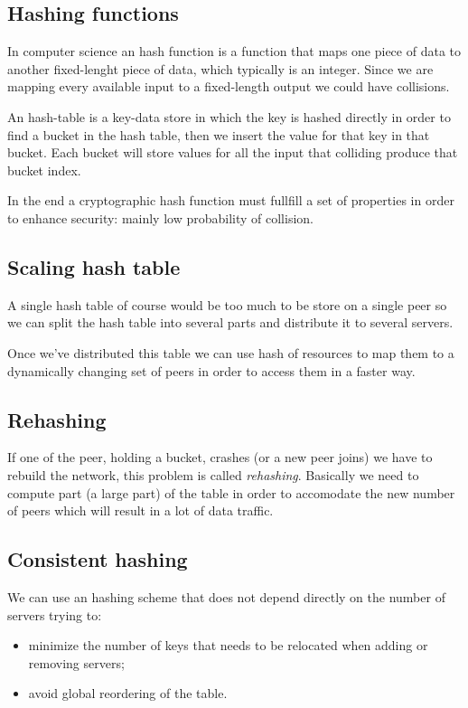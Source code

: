 \subsection{Hashing functions}
In computer science an hash function is a function that maps one piece of data to another fixed-lenght piece of data, which typically is an integer.
Since we are mapping every available input to a fixed-length output we could have collisions.

An hash-table is a key-data store in which the key is hashed directly in order to find a bucket in the hash table, then we insert the value for that key in that bucket.
Each bucket will store values for all the input that colliding produce that bucket index.

In the end a cryptographic hash function must fullfill a set of properties in order to enhance security: mainly low probability of collision.

\subsection{Scaling hash table}
A single hash table of course would be too much to be store on a single peer so we can split the hash table into several parts and distribute it to several servers.

Once we've distributed this table we can use hash of resources to map them to a dynamically changing set of peers in order to access them in a faster way.

\subsection{Rehashing}
If one of the peer, holding a bucket, crashes (or a new peer joins) we have to rebuild the network, this problem is called \emph{rehashing}.
Basically we need to compute part (a large part) of the table in order to accomodate the new number of peers which will result in a lot of data traffic.

\subsection{Consistent hashing}
We can use an hashing scheme that does not depend directly on the number of servers trying to:
\begin{itemize}
    \item minimize the number of keys that needs to be relocated when adding or removing servers;
    \item avoid global reordering of the table.
\end{itemize}


